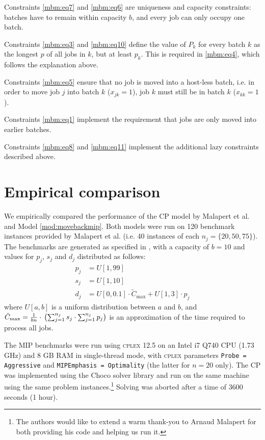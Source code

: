\documentclass[oribibl]{llncs}
\begin{document}
Constraints \eqref{mbm:eq7} and \eqref{mbm:eq6} are uniqueness and
capacity constraints: batches have to remain within capacity $b$, and every
job can only occupy one batch.

Constraints \eqref{mbm:eq3} and \eqref{mbm:eq10} define the value of
$P_k$ for every batch $k$ as the longest $p$ of all jobs in $k$, but
at least $p_k$. This is required in \eqref{mbm:eq4}, which follows the
explanation above.

Constraints \eqref{mbm:eq5} ensure that no job is moved into a host-less batch,
i.e. in order to move job $j$ into batch $k$ ($x_{jk} = 1$), job $k$ must still
be in batch $k$ ($x_{kk} = 1$).

Constraints \eqref{mbm:eq1} implement the requirement that jobs are only moved
into earlier batches.

Constraints \eqref{mbm:eq8} and \eqref{mbm:eq11} implement the additional lazy
constraints described above.

\section{Empirical comparison}
\label{sec:exp}

We empirically compared the performance of the CP model by Malapert et al. and
Model \ref{mod:movebackmip}. Both models were run on 120
benchmark instances provided by Malapert et al. (i.e. 40 instances of each $n_j = \{20,
50, 75\}$). The benchmarks are generated as specified in \cite{Daste1}, with a
capacity of $b = 10$ and values for $p_j$, $s_j$ and $d_j$ distributed as follows:
\begin{align}
p_j &= U[1, 99] \\
s_j &= U[1, 10] \\
d_j &= U[0, 0.1] \cdot \tilde{C}_\text{max} + U[1, 3] \cdot p_j
\end{align}
where $U[a, b]$ is a uniform distribution between $a$ and $b$, and
$\tilde{C}_\text{max} = \frac{1}{bn} \cdot \\ \left( \sum_{j=1}^{n_j} s_j \cdot \sum_{j=1}^{n_j}
p_j \right)$ is an approximation of the time required to process
all jobs.

The MIP benchmarks were run using \textsc{cplex} 12.5 \cite{cplex} on an Intel
i7 Q740 CPU (1.73 GHz) and 8 GB RAM in single-thread mode, with \textsc{cplex}
parameters \texttt{Probe = Aggressive} and \texttt{MIPEmphasis = Optimality}
(the latter for $n=20$ only). The CP was implemented using the Choco solver library \cite{choco} and run on the same
machine using the same problem instances.\footnote{The authors would like to extend a warm
  thank-you to Arnaud Malapert for both providing his code and helping us run
it.}
Solving was aborted after a time of 3600 seconds (1 hour).
\end{document}
